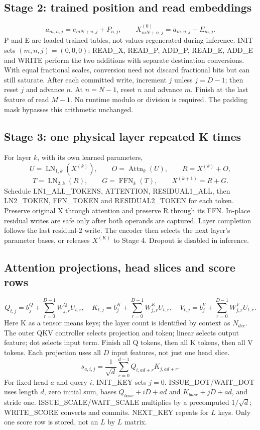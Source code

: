 \documentclass[11pt,a4paper]{article}
\begin{document}
\subsection{Stage 2: trained position and read embeddings}
\[
a_{m,n,j}=e_{mN+n,j}+P_{n,j},\qquad
X^{(0)}_{mN+n,j}=a_{m,n,j}+E_{m,j}.
\]
P and E are loaded trained tables, not values regenerated during inference. INIT sets $(m,n,j)=(0,0,0)$; READ\_X, READ\_P, ADD\_P, READ\_E, ADD\_E and WRITE perform the two additions with separate destination conversions. With equal fractional scales, conversion need not discard fractional bits but can still saturate.
After each committed write, increment $j$ unless $j=D-1$; then reset $j$ and advance $n$. At $n=N-1$, reset $n$ and advance $m$. Finish at the last feature of read $M-1$. No runtime modulo or division is required. The padding mask bypasses this arithmetic unchanged.

\subsection{Stage 3: one physical layer repeated K times}
For layer $k$, with its own learned parameters,
\[
U=\operatorname{LN}_{1,k}(X^{(k)}),\qquad O=\operatorname{Attn}_{k}(U),\qquad R=X^{(k)}+O,
\]
\[
T=\operatorname{LN}_{2,k}(R),\qquad G=\operatorname{FFN}_{k}(T),\qquad X^{(k+1)}=R+G.
\]
Schedule LN1\_ALL\_TOKENS, ATTENTION, RESIDUAL1\_ALL, then LN2\_TOKEN, FFN\_TOKEN and RESIDUAL2\_TOKEN for each token. Preserve original X through attention and preserve R through its FFN. In-place residual writes are safe only after both operands are captured. Layer completion follows the last residual-2 write. The encoder then selects the next layer's parameter bases, or releases $X^{(K)}$ to Stage 4. Dropout is disabled in inference.

\subsection{Attention projections, head slices and score rows}
\[
Q_{t,j}=b^Q_j+\sum_{r=0}^{D-1}W^Q_{j,r}U_{t,r},\quad
K_{t,j}=b^K_j+\sum_{r=0}^{D-1}W^K_{j,r}U_{t,r},\quad
V_{t,j}=b^V_j+\sum_{r=0}^{D-1}W^V_{j,r}U_{t,r}.
\]
Here K as a tensor means keys; the layer count is identified by context as $N_{dec}$. The outer QKV controller selects projection and token; linear selects output feature; dot selects input term. Finish all Q tokens, then all K tokens, then all V tokens. Each projection uses all $D$ input features, not just one head slice.
\[
s_{a,i,j}=\frac{1}{\sqrt d}\sum_{r=0}^{d-1}Q_{i,ad+r}K_{j,ad+r}.
\]
For fixed head $a$ and query $i$, INIT\_KEY sets $j=0$. ISSUE\_DOT/WAIT\_DOT uses length $d$, zero initial sum, bases $Q_{base}+iD+ad$ and $K_{base}+jD+ad$, and stride one. ISSUE\_SCALE/WAIT\_SCALE multiplies by a precomputed $1/\sqrt d$; WRITE\_SCORE converts and commits. NEXT\_KEY repeats for $L$ keys. Only one score row is stored, not an $L$ by $L$ matrix.
\end{document}
